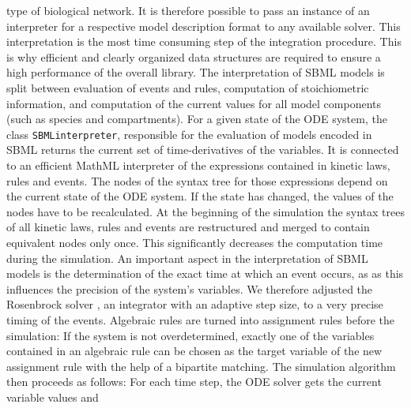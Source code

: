 \documentclass{bioinfo}
\newcommand{\SBMLinterpreter}{\texttt{SBML\-interpreter}}
\begin{document}
\begin{methods}
type of biological network. It is therefore possible to pass an instance of an
interpreter for a respective model description format to any available solver.
%
This interpretation is the most time consuming step of the integration procedure.
This is why efficient and clearly organized data structures are required to
ensure a high performance of the overall library. The interpretation of SBML
models is split between evaluation of events and rules, computation of
stoichiometric information, and computation of the current values for all model
components (such as species and compartments).
%
For a given state of the ODE system, the class \SBMLinterpreter, responsible
for the evaluation of models encoded in SBML returns the current set of
time-derivatives of the variables.
It is connected to an efficient MathML interpreter of the expressions contained
in kinetic laws, rules and events. The nodes of the syntax tree for those
expressions depend on the current state of the ODE system. If the state has
changed, the values of the nodes have to be recalculated.
At the beginning of the simulation the syntax trees of all kinetic laws, rules
and events are restructured and merged to contain equivalent nodes only once.
This significantly decreases the computation time during the simulation.
%
An important aspect in the interpretation of SBML models is the
determination of the exact time at which an event occurs, as as this influences
the precision of the system's variables. We therefore adjusted the Rosenbrock
solver \citep{Kotcon2011}, an integrator with an adaptive step size, to a very
precise timing of the events.
%
Algebraic rules are turned into assignment rules before the
simulation: If the system is not overdetermined, exactly one of the variables
contained in an algebraic rule can be chosen as the target variable of the
new assignment rule with the help of a bipartite matching.
%
The simulation algorithm then proceeds as follows: For each time step, the ODE
solver gets the current variable values and

\end{methods}
\end{document}
